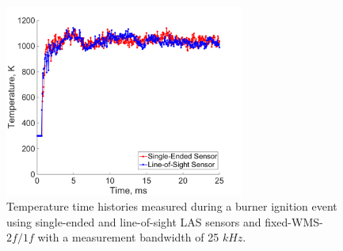 \vspace{20mm}

\begin{figure}[t]
    \centering
        \includegraphics[width=0.7\textwidth]{fig/ch4_fig7.png}
        \caption{Temperature time histories measured during a burner ignition event using single-ended and line-of-sight LAS sensors and fixed-WMS-$2f/1f$ with a measurement bandwidth of 25 $kHz$.}
    \label{fig:ch4_8}
\end{figure}

